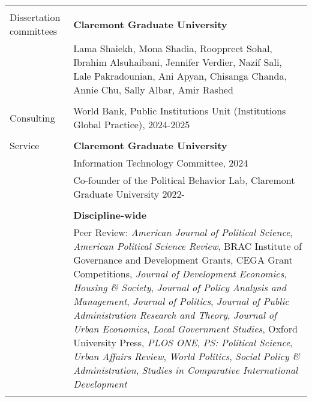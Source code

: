 \documentclass[letterpaper, 10.5pt]{article}
\begin{document}
\begin{longtable}{p{1.5in}p{5in}}
&\\

%
%
%


{{Dissertation committees}}
& \textbf{Claremont Graduate University} \\

&Lama Shaiekh, Mona Shadia, Rooppreet Sohal, Ibrahim Alsuhaibani, Jennifer Verdier, Nazif Sali, Lale Pakradounian, Ani Apyan, Chisanga Chanda, Annie Chu, Sally Albar, Amir Rashed \\
&\\

\nohyphens{{Consulting}} & World Bank, Public Institutions Unit (Institutions Global Practice), 2024-2025\\

&\\


\nohyphens{{Service}} & \textbf{Claremont Graduate University} \\ & Information Technology Committee, 2024 \\
& Co-founder of the Political Behavior Lab, Claremont Graduate University 2022- \\

&\\


& \textbf{Discipline-wide} \\
&Peer Review: \textit{American Journal of Political Science}, \textit{American Political Science Review}, BRAC Institute of Governance and Development Grants, CEGA Grant Competitions, \textit{Journal of Development Economics}, \textit{Housing \& Society},
\textit{Journal of Policy Analysis and Management}, \textit{Journal of Politics}, \textit{Journal of Public Administration Research and Theory}, \textit{Journal of Urban Economics}, \textit{Local Government Studies}, Oxford University Press, \textit{PLOS ONE}, \textit{PS: Political Science}, \textit{Urban Affairs Review}, \textit{World Politics}, \textit{Social Policy \& Administration}, \textit{Studies in Comparative International Development}\\ 
&\\


\end{longtable}
\end{document}
